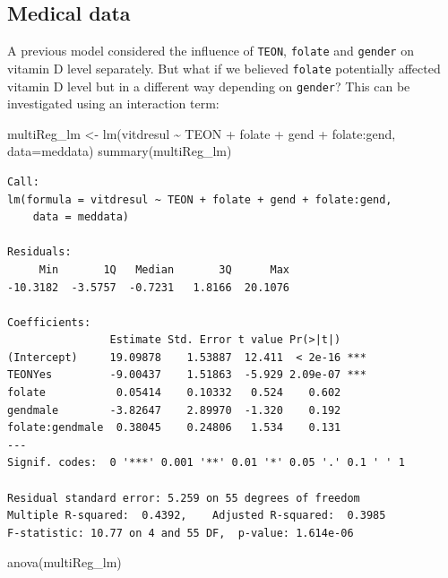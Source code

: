 \documentclass[
  oneside]{krantz}
\newenvironment{Shaded}{\begin{snugshade}}{\end{snugshade}}
\newcommand{\AttributeTok}[1]{\textcolor[rgb]{0.77,0.63,0.00}{#1}}
\newcommand{\FunctionTok}[1]{\textcolor[rgb]{0.00,0.00,0.00}{#1}}
\newcommand{\NormalTok}[1]{#1}
\newcommand{\OtherTok}[1]{\textcolor[rgb]{0.56,0.35,0.01}{#1}}
\newcommand{\SpecialCharTok}[1]{\textcolor[rgb]{0.00,0.00,0.00}{#1}}
\begin{document}
\hypertarget{medical-data}{%
\subsection{Medical data}\label{medical-data}}

A previous model considered the influence of \texttt{TEON}, \texttt{folate} and \texttt{gender} on vitamin D level separately. But what if we believed \texttt{folate} potentially affected vitamin D level but in a different way depending on \texttt{gender}? This can be investigated using an interaction term:

\begin{Shaded}
\begin{Highlighting}[]
\NormalTok{multiReg\_lm }\OtherTok{\textless{}{-}} \FunctionTok{lm}\NormalTok{(vitdresul }\SpecialCharTok{\textasciitilde{}}\NormalTok{ TEON }\SpecialCharTok{+}\NormalTok{ folate }\SpecialCharTok{+}\NormalTok{ gend }\SpecialCharTok{+}\NormalTok{ folate}\SpecialCharTok{:}\NormalTok{gend, }\AttributeTok{data=}\NormalTok{meddata)}
\FunctionTok{summary}\NormalTok{(multiReg\_lm)}
\end{Highlighting}
\end{Shaded}

\begin{verbatim}
Call:
lm(formula = vitdresul ~ TEON + folate + gend + folate:gend, 
    data = meddata)

Residuals:
     Min       1Q   Median       3Q      Max 
-10.3182  -3.5757  -0.7231   1.8166  20.1076 

Coefficients:
                Estimate Std. Error t value Pr(>|t|)    
(Intercept)     19.09878    1.53887  12.411  < 2e-16 ***
TEONYes         -9.00437    1.51863  -5.929 2.09e-07 ***
folate           0.05414    0.10332   0.524    0.602    
gendmale        -3.82647    2.89970  -1.320    0.192    
folate:gendmale  0.38045    0.24806   1.534    0.131    
---
Signif. codes:  0 '***' 0.001 '**' 0.01 '*' 0.05 '.' 0.1 ' ' 1

Residual standard error: 5.259 on 55 degrees of freedom
Multiple R-squared:  0.4392,    Adjusted R-squared:  0.3985 
F-statistic: 10.77 on 4 and 55 DF,  p-value: 1.614e-06
\end{verbatim}

\begin{Shaded}
\begin{Highlighting}[]
\FunctionTok{anova}\NormalTok{(multiReg\_lm)}
\end{Highlighting}
\end{Shaded}
\end{document}
